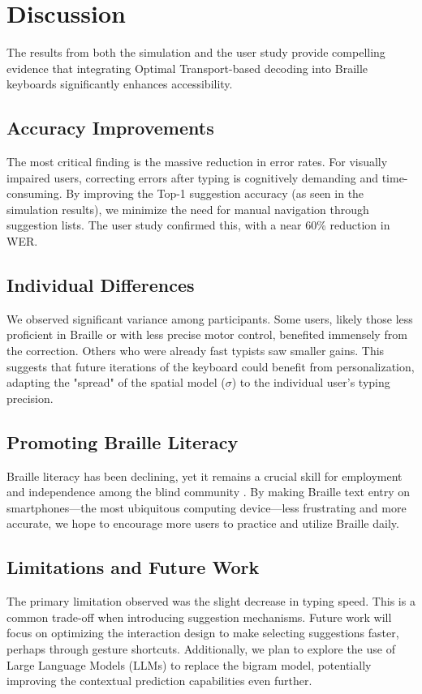 \documentclass[manuscript,review]{acmart}
\begin{document}
\section{Discussion}

The results from both the simulation and the user study provide compelling evidence that integrating Optimal Transport-based decoding into Braille keyboards significantly enhances accessibility.

\subsection{Accuracy Improvements}
The most critical finding is the massive reduction in error rates. For visually impaired users, correcting errors after typing is cognitively demanding and time-consuming. By improving the Top-1 suggestion accuracy (as seen in the simulation results), we minimize the need for manual navigation through suggestion lists. The user study confirmed this, with a near 60\% reduction in WER.

\subsection{Individual Differences}
We observed significant variance among participants. Some users, likely those less proficient in Braille or with less precise motor control, benefited immensely from the correction. Others who were already fast typists saw smaller gains. This suggests that future iterations of the keyboard could benefit from personalization, adapting the "spread" of the spatial model ($\sigma$) to the individual user's typing precision.

\subsection{Promoting Braille Literacy}
Braille literacy has been declining, yet it remains a crucial skill for employment and independence among the blind community \cite{NationalFederationBlind}. By making Braille text entry on smartphones—the most ubiquitous computing device—less frustrating and more accurate, we hope to encourage more users to practice and utilize Braille daily.

\subsection{Limitations and Future Work}
The primary limitation observed was the slight decrease in typing speed. This is a common trade-off when introducing suggestion mechanisms. Future work will focus on optimizing the interaction design to make selecting suggestions faster, perhaps through gesture shortcuts. Additionally, we plan to explore the use of Large Language Models (LLMs) to replace the bigram model, potentially improving the contextual prediction capabilities even further.
\end{document}
